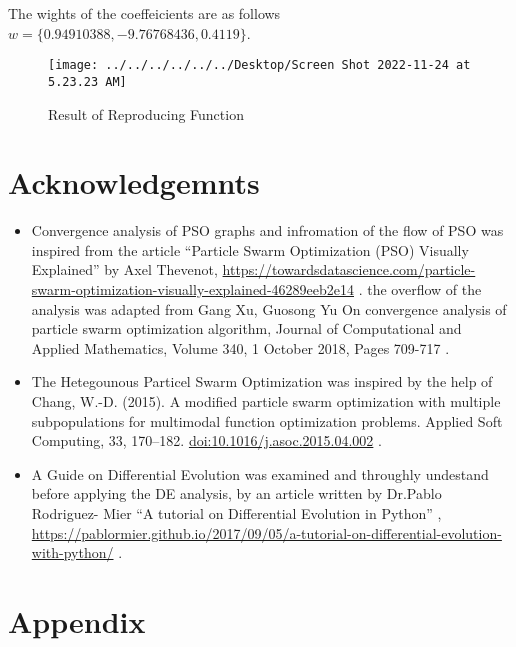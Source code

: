 \documentclass[
]{article}
\begin{document}
The wights of the coeffeicients are as follows
\(w=\{0.94910388,-9.76768436,0.4119\}\).

\begin{figure}[H]

{\centering \texttt{[image: ../../../../../../Desktop/Screen Shot 2022-11-24 at 5.23.23 AM]} 

}

\caption{Result of Reproducing Function \label{fig:wegiht}}\label{fig:wegiht}
\end{figure}

\newpage

\hypertarget{acknowledgemnts}{%
\section{Acknowledgemnts}\label{acknowledgemnts}}

\begin{itemize}
\item
  Convergence analysis of PSO graphs and infromation of the flow of PSO
  was inspired from the article ``Particle Swarm Optimization (PSO)
  Visually Explained'' by Axel Thevenot,
  \url{https://towardsdatascience.com/particle-swarm-optimization-visually-explained-46289eeb2e14}
  . the overflow of the analysis was adapted from Gang Xu, Guosong Yu On
  convergence analysis of particle swarm optimization algorithm, Journal
  of Computational and Applied Mathematics, Volume 340, 1 October 2018,
  Pages 709-717 .
\item
  The Hetegounous Particel Swarm Optimization was inspired by the help
  of Chang, W.-D. (2015). A modified particle swarm optimization with
  multiple subpopulations for multimodal function optimization problems.
  Applied Soft Computing, 33, 170--182.
  \url{doi:10.1016/j.asoc.2015.04.002} .
\item
  A Guide on Differential Evolution was examined and throughly undestand
  before applying the DE analysis, by an article written by Dr.Pablo
  Rodriguez- Mier ``A tutorial on Differential Evolution in Python'' ,
  \url{https://pablormier.github.io/2017/09/05/a-tutorial-on-differential-evolution-with-python/}
  .
\end{itemize}

\newpage

\hypertarget{appendix}{%
\section{Appendix}\label{appendix}}
\end{document}
